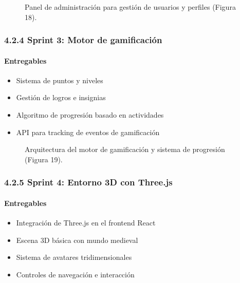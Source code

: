 \begin{figure}[H]
	\centering
	\caption{Panel de administración para gestión de usuarios y perfiles (Figura 18).}
	\label{fig:user-management}
\end{figure}

\subsubsection{4.2.4 Sprint 3: Motor de gamificación}

\paragraph{Entregables}
\begin{itemize}
\item Sistema de puntos y niveles
\item Gestión de logros e insignias
\item Algoritmo de progresión basado en actividades
\item API para tracking de eventos de gamificación
\end{itemize}

\begin{figure}[H]
	\centering
	\caption{Arquitectura del motor de gamificación y sistema de progresión (Figura 19).}
	\label{fig:gamification-engine}
\end{figure}

\subsubsection{4.2.5 Sprint 4: Entorno 3D con Three.js}

\paragraph{Entregables}
\begin{itemize}
\item Integración de Three.js en el frontend React
\item Escena 3D básica con mundo medieval
\item Sistema de avatares tridimensionales
\item Controles de navegación e interacción
\end{itemize}

